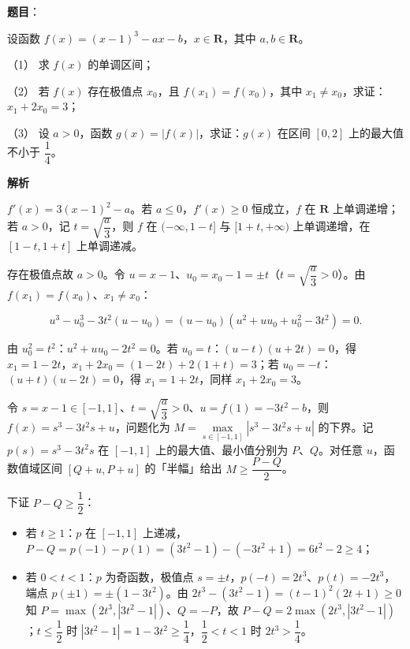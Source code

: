 \begin{answer}

\textbf{题目}：

设函数 \(f(x)=(x-1)^{3}-ax-b\)，\(x\in\mathbf{R}\)，其中 \(a,b\in\mathbf{R}\)。

（1） 求 \(f(x)\) 的单调区间；

（2） 若 \(f(x)\) 存在极值点 \(x_{0}\)，且 \(f(x_{1})=f(x_{0})\)，其中 \(x_{1}\neq x_{0}\)，求证：\(x_{1}+2x_{0}=3\)；

（3） 设 \(a>0\)，函数 \(g(x)=|f(x)|\)，求证：\(g(x)\) 在区间 \([0,2]\) 上的最大值不小于 \(\dfrac{1}{4}\)。

\textbf{解析}


\(f'(x)=3(x-1)^{2}-a\)。若 \(a\leqslant0\)，\(f'(x)\geqslant0\) 恒成立，\(f\) 在 \(\mathbf{R}\) 上单调递增；若 \(a>0\)，记 \(t=\sqrt{\dfrac{a}{3}}\)，则 \(f\) 在 \((-\infty,1-t]\) 与 \([1+t,+\infty)\) 上单调递增，在 \([1-t,1+t]\) 上单调递减。


存在极值点故 \(a>0\)。令 \(u=x-1\)、\(u_{0}=x_{0}-1=\pm t\)（\(t=\sqrt{\dfrac{a}{3}}>0\)）。由 \(f(x_{1})=f(x_{0})\)、\(x_{1}\neq x_{0}\)：

\nopagebreak[4]
\[
u^{3}-u_{0}^{3}-3t^{2}(u-u_{0})=(u-u_{0})\left(u^{2}+uu_{0}+u_{0}^{2}-3t^{2}\right)=0.
\]

由 \(u_{0}^{2}=t^{2}\)：\(u^{2}+uu_{0}-2t^{2}=0\)。若 \(u_{0}=t\)：\((u-t)(u+2t)=0\)，得 \(x_{1}=1-2t\)，\(x_{1}+2x_{0}=(1-2t)+2(1+t)=3\)；若 \(u_{0}=-t\)：\((u+t)(u-2t)=0\)，得 \(x_{1}=1+2t\)，同样 \(x_{1}+2x_{0}=3\)。


令 \(s=x-1\in[-1,1]\)、\(t=\sqrt{\dfrac{a}{3}}>0\)、\(u=f(1)=-3t^{2}-b\)，则 \(f(x)=s^{3}-3t^{2}s+u\)，问题化为 \(M=\max\limits_{s\in[-1,1]}|s^{3}-3t^{2}s+u|\) 的下界。记 \(p(s)=s^{3}-3t^{2}s\) 在 \([-1,1]\) 上的最大值、最小值分别为 \(P\)、\(Q\)。对任意 \(u\)，函数值域区间 \([Q+u,P+u]\) 的「半幅」给出 \(M\geqslant\dfrac{P-Q}{2}\)。


下证 \(P-Q\geqslant\dfrac{1}{2}\)：

\begin{itemize}
\item 若 \(t\geqslant1\)：\(p\) 在 \([-1,1]\) 上递减，\(P-Q=p(-1)-p(1)=(3t^{2}-1)-(-3t^{2}+1)=6t^{2}-2\geqslant4\)；
\item 若 \(0<t<1\)：\(p\) 为奇函数，极值点 \(s=\pm t\)，\(p(-t)=2t^{3}\)、\(p(t)=-2t^{3}\)，端点 \(p(\pm1)=\pm(1-3t^{2})\)。由 \(2t^{3}-(3t^{2}-1)=(t-1)^{2}(2t+1)\geqslant0\) 知 \(P=\max\left(2t^{3},|3t^{2}-1|\right)\)、\(Q=-P\)，故 \(P-Q=2\max\left(2t^{3},|3t^{2}-1|\right)\)；\(t\leqslant\dfrac{1}{2}\) 时 \(|3t^{2}-1|=1-3t^{2}\geqslant\dfrac{1}{4}\)，\(\dfrac{1}{2}<t<1\) 时 \(2t^{3}>\dfrac{1}{4}\)。
\end{itemize}


\end{answer}
